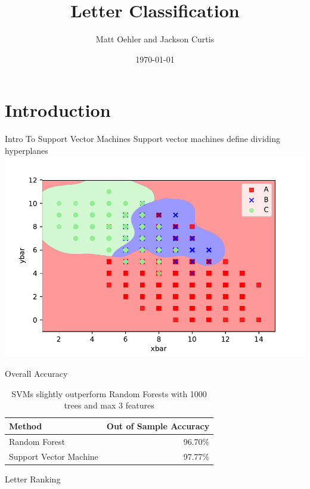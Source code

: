 \documentclass{beamer}
\title[Your Short Title]{Letter Classification}
\author{Matt Oehler and Jackson Curtis}
\institute{Stat 536}
\date{\today}
\begin{document}
\begin{frame}
  \titlepage
\end{frame}


\section{Introduction}

\begin{frame}{Intro To Support Vector Machines}
Support vector machines define dividing hyperplanes 
\includegraphics[scale=.4]{DemoSVM.pdf}
\end{frame}

\begin{frame}{Overall Accuracy}
\begin{table}
\centering
\begin{tabular}{lr}
Method & Out of Sample Accuracy \\
\hline
Random Forest & 96.70\% \\
Support Vector Machine & 97.77\% \\
\end{tabular}
\caption{SVMs slightly outperform Random Forests with 1000 trees and max 3 features}
\end{table}
\end{frame}

\begin{frame}{Letter Ranking}
\begin{table}

\centering

\caption{Ranking of which letters are easiest to predict}
\end{table}

\end{frame}
\end{document}
